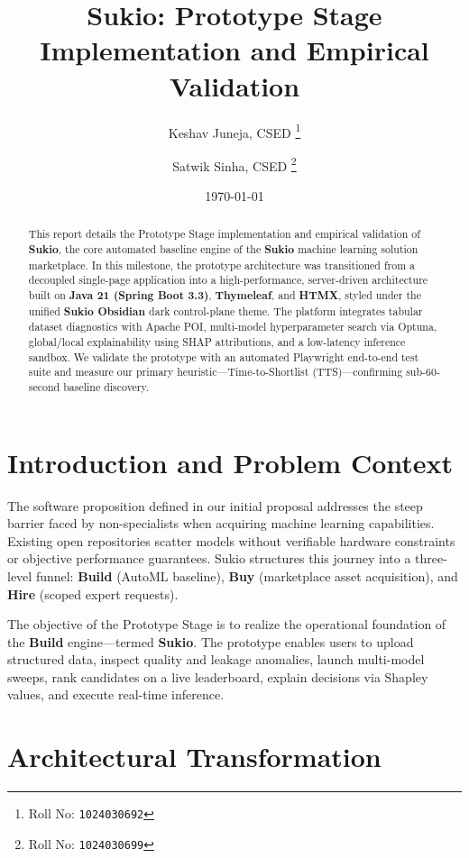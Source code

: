 ﻿\documentclass[11pt,a4paper]{article}
\title{Sukio: Prototype Stage Implementation and Empirical Validation}
\author{
  Keshav Juneja, CSED%
  \thanks{Roll No: \texttt{1024030692}}
  \and
  Satwik Sinha, CSED%
  \thanks{Roll No: \texttt{1024030699}}
}
\date{\today}
\begin{document}
\maketitle

\begin{abstract}
This report details the Prototype Stage implementation and empirical validation of \textbf{Sukio}, the core automated baseline engine of the \textbf{Sukio} machine learning solution marketplace. In this milestone, the prototype architecture was transitioned from a decoupled single-page application into a high-performance, server-driven architecture built on \textbf{Java 21 (Spring Boot 3.3)}, \textbf{Thymeleaf}, and \textbf{HTMX}, styled under the unified \textbf{Sukio Obsidian} dark control-plane theme. The platform integrates tabular dataset diagnostics with Apache POI, multi-model hyperparameter search via Optuna, global/local explainability using SHAP attributions, and a low-latency inference sandbox. We validate the prototype with an automated Playwright end-to-end test suite and measure our primary heuristic---Time-to-Shortlist (TTS)---confirming sub-60-second baseline discovery.
\end{abstract}

\section{Introduction and Problem Context}
The software proposition defined in our initial proposal addresses the steep barrier faced by non-specialists when acquiring machine learning capabilities. Existing open repositories scatter models without verifiable hardware constraints or objective performance guarantees. Sukio structures this journey into a three-level funnel: \textbf{Build} (AutoML baseline), \textbf{Buy} (marketplace asset acquisition), and \textbf{Hire} (scoped expert requests).

The objective of the Prototype Stage is to realize the operational foundation of the \textbf{Build} engine---termed \textbf{Sukio}. The prototype enables users to upload structured data, inspect quality and leakage anomalies, launch multi-model sweeps, rank candidates on a live leaderboard, explain decisions via Shapley values, and execute real-time inference.

\section{Architectural Transformation}
\end{document}
